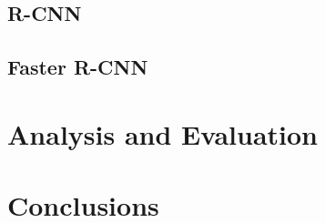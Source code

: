 \documentclass[12pt, landscape, margin=2cm]{article}
\begin{document}
\begin{multicols}{3}
\subsection{R-CNN}
\subsection{Faster R-CNN}

\section{Analysis and Evaluation}
\section{Conclusions}
\lipsum*[3]



\nocite{*}
\end{multicols}
\end{document}
